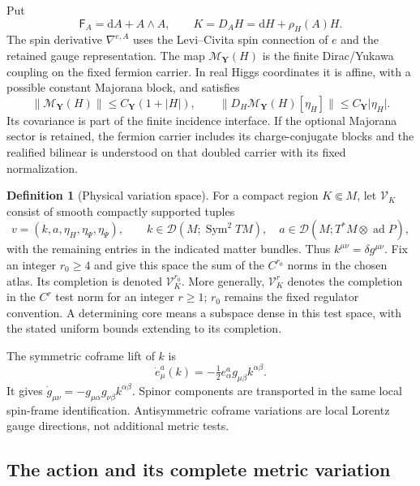 \documentclass[11pt]{article}
\numberwithin{equation}{section}
\theoremstyle{definition}
\newtheorem{definition}[definition]{Definition}
\theoremstyle{remark}
\newcommand{\dd}{\mathrm d}
\newcommand{\Sym}{\operatorname{Sym}}
\newcommand{\norm}[1]{\lVert#1\rVert}
\newcommand{\abs}[1]{\lvert#1\rvert}
\newcommand{\Dtest}{\mathcal D}
\newcommand{\Vtest}{\mathscr V}
\newcommand{\Fcurv}{\mathsf F}
\newcommand{\bPsi}{\overline\Psi}
\begin{document}
Put
\begin{equation}
 \Fcurv_A=\dd A+A\wedge A,\qquad
 K=D_AH=\dd H+\rho_H(A)H.
 \label{eq:curvature-higgs}
\end{equation}
The spin derivative $\nabla^{e,A}$ uses the Levi--Civita spin connection of $e$ and the retained gauge representation. The map $\mathscr M_{\boldsymbol Y}(H)$ is the finite Dirac/Yukawa coupling on the fixed fermion carrier. In real Higgs coordinates it is affine, with a possible constant Majorana block, and satisfies
\begin{equation}
 \norm{\mathscr M_{\boldsymbol Y}(H)}\le C_{\boldsymbol Y}(1+\abs H),
 \qquad
 \norm{D_H\mathscr M_{\boldsymbol Y}(H)[\eta_H]}
 \le C_{\boldsymbol Y}\abs{\eta_H}.
 \label{eq:yukawa-bound}
\end{equation}
Its covariance is part of the finite incidence interface. If the optional Majorana sector is retained, the fermion carrier includes its charge-conjugate blocks and the realified bilinear is understood on that doubled carrier with its fixed normalization.

\begin{definition}[Physical variation space]
\label{def:tests}
For a compact region $K\Subset M$, let $\Vtest_K$ consist of smooth compactly supported tuples
\[
 v=(k,a,\eta_H,\eta_\Psi,\eta_{\bPsi}),
 \qquad k\in\Dtest(M;\Sym^2 TM),\quad
 a\in\Dtest(M;T^*M\otimes\operatorname{ad}P),
\]
with the remaining entries in the indicated matter bundles. Thus $k^{\mu\nu}=\delta g^{\mu\nu}$. Fix an integer $r_0\ge4$ and give this space the sum of the $C^{r_0}$ norms in the chosen atlas. Its completion is denoted $\Vtest_K^{r_0}$. More generally, $\Vtest_K^r$ denotes the completion in the $C^r$ test norm for an integer $r\ge1$; $r_0$ remains the fixed regulator convention. A determining core means a subspace dense in this test space, with the stated uniform bounds extending to its completion.
\end{definition}

The symmetric coframe lift of $k$ is
\begin{equation}
 \dot e^a_\mu(k)=-\tfrac12e^a_\alpha g_{\mu\beta}k^{\alpha\beta}.
 \label{eq:metric-lift}
\end{equation}
It gives $\dot g_{\mu\nu}=-g_{\mu\alpha}g_{\nu\beta}k^{\alpha\beta}$. Spinor components are transported in the same local spin-frame identification. Antisymmetric coframe variations are local Lorentz gauge directions, not additional metric tests.

\subsection{The action and its complete metric variation}
\end{document}
